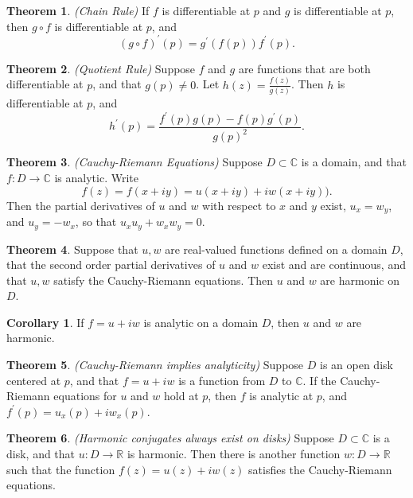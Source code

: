 \documentclass[a4paper]{article}
\theoremstyle{definition}
\newtheorem{theorem}{Theorem}
\newtheorem{corollary}{Corollary}
\begin{document}
	\begin{theorem}
		\emph{(Chain Rule)}
		If $f$ is differentiable at $p$ and $g$ is differentiable at $p$, then $g \circ f$ is differentiable at $p$, and
		$$(g \circ f)^{\prime}(p) = g^{\prime}(f(p))f^{\prime}(p).$$
	\end{theorem}
	
	\begin{theorem}
		\emph{(Quotient Rule)}
		Suppose $f$ and $g$ are functions that are both differentiable at $p$, and that $g(p) \neq 0$. Let $h(z) = \frac{f(z)}{g(z)}$. Then $h$ is differentiable at $p$, and
		$$h^{\prime}(p) = \frac{f^{\prime}(p)g(p) - f(p)g^{\prime}(p)}{g(p)^2}.$$
	\end{theorem}
	
	\begin{theorem}
		\emph{(Cauchy-Riemann Equations)}
		Suppose $D \subset \mathbb{C}$ is a domain, and that $f : D \rightarrow \mathbb{C}$ is analytic. Write
		$$f(z) = f(x + iy) = u(x + iy) + iw(x + iy)).$$
		Then the partial derivatives of $u$ and $w$ with respect to $x$ and $y$ exist, $u_{x} = w_{y}$, and $u_{y} = -w_{x}$, so that $u_{x}u_{y} + w_{x}w_{y} = 0$.
	\end{theorem}
	
	\begin{theorem}
		Suppose that $u, w$ are real-valued functions defined on a domain $D$, that the second order partial derivatives of $u$ and $w$ exist and are continuous, and that $u, w$ satisfy the Cauchy-Riemann equations. Then $u$ and $w$ are harmonic on $D$.
	\end{theorem}
	
	\begin{corollary}
		If $f = u + iw$ is analytic on a domain $D$, then $u$ and $w$ are harmonic.
	\end{corollary}
	
	\begin{theorem}
		\emph{(Cauchy-Riemann implies analyticity)}
		Suppose $D$ is an open disk centered at $p$, and that $f = u + iw$ is a function from $D$ to $\mathbb{C}$. If the Cauchy-Riemann equations for $u$ and $w$ hold at $p$, then $f$ is analytic at $p$, and $f^{\prime}(p) = u_{x}(p) + iw_{x}(p)$.
	\end{theorem}
	
	\begin{theorem}
		\emph{(Harmonic conjugates always exist on disks)}
		Suppose $D \subset \mathbb{C}$ is a disk, and that $u : D \rightarrow \mathbb{R}$ is harmonic. Then there is another function $w : D \rightarrow \mathbb{R}$ such that the function $f(z) = u(z) + iw(z)$ satisfies the Cauchy-Riemann equations.
	\end{theorem}
	
\end{document}
